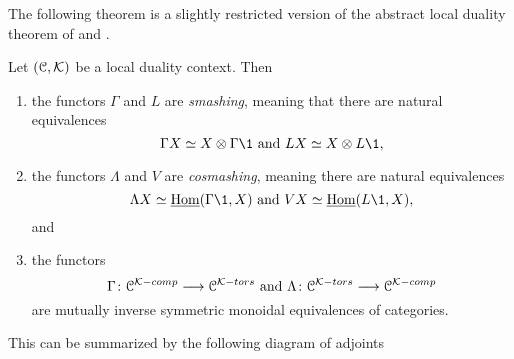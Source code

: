 The following theorem is a slightly restricted version of the abstract local duality theorem of \cite[3.3.5]{hovey-palmiery-strickland_97} and \cite[2.21]{barthel-heard-valenzuela_2018}.  

\begin{theorem}
    \label{ch1:thm:local-duality}
    Let $(\EuScript{C}, \mathcal{K})$ be a local duality context. Then
    \begin{enumerate}
        \item the functors $\Gamma$ and $L$ are \emph{smashing}, meaning that there are natural equivalences
        \[\Gamma X\simeq X\otimes \Gamma \1 \text{ and } LX\simeq X\otimes L\1,\]
        \item the functors $\Lambda$ and $V$ are \emph{cosmashing}, meaning there are natural equivalences
        \[\Lambda X\simeq \iHom(\Gamma \1,X) \text{ and } VX\simeq \iHom(L\1, X),\] 
        and
        \item the functors 
        \[\Gamma\colon \EuScript{C}^{\mathcal{K}-comp}\longrightarrow \EuScript{C}^{\mathcal{K}-tors} \text{ and } \Lambda\colon \EuScript{C}^{\mathcal{K}-tors}\longrightarrow \EuScript{C}^{\mathcal{K}-comp}\] 
        are mutually inverse symmetric monoidal equivalences of categories.
    \end{enumerate}
    This can be summarized by the following diagram of adjoints
    \begin{center}
    \end{center}
\end{theorem}

